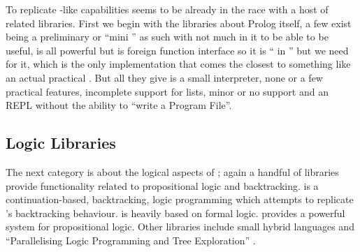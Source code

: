 \documentclass[thesis-solanki.tex]{subfiles}
\begin{document}
To replicate -like
capabilities  seems to be already in the race
with a host of related libraries.
First we begin with the libraries about Prolog
itself,
a few exist \cite{nanoprolog-lib} being a preliminary or
``mini '' as such with not much in it to be able to be useful, \cite{hswip-lib} is all powerful but is 
foreign function interface so it is `` in '' but we need  for it,
\cite{prolog-lib}\yyy{}{\Large,} which is the only implementation that comes the closest
to something like an actual practical .
But all they give is a small interpreter, none or a few practical features, incomplete support for lists, minor or
no  support and an REPL without the ability to ``write a  Program
File''.

\subsection{Logic Libraries}

The next category is about the logical aspects of ; again a handful of libraries  provide  functionality  related
to propositional logic and backtracking.
\cite{logict-lib} is a continuation-based, backtracking, logic programming  which attempts
to replicate
's backtracking behaviour.
 is heavily based on formal logic.
\cite{proplogic-lib} provides a powerful system for propositional logic.
Other libraries include small hybrid languages \cite{cflp-lib} and ``Parallelising Logic Programming and Tree
Exploration'' \cite{logic-grows-on-trees-lib}.
\end{document}

